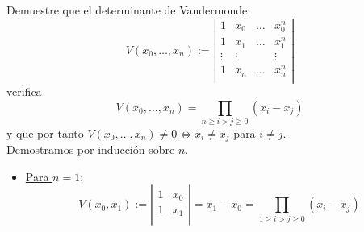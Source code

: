 \begin{ejercicio}
    Demuestre que el determinante de Vandermonde
    \begin{equation*}
        V(x_0, \dots, x_n):= \left|
        \begin{array}{cccc}
            1 & x_0 & \dots & x_0^n \\
            1 & x_1 & \dots & x_1^n \\
            \vdots & \vdots &  & \vdots \\
            1 & x_n & \dots & x_n^n \\
        \end{array}\right|
    \end{equation*}
    verifica
    \begin{equation*}
        V(x_0, \dots, x_n) = \prod_{n\geq i>j\geq 0}(x_i-x_j)
    \end{equation*}
    y que por tanto $V(x_0, \dots, x_n) \neq 0 \Longleftrightarrow x_i\neq x_j$ para $i\neq j$.\\

    Demostramos por inducción sobre $n$.
    \begin{itemize}
        \item \underline{Para $n=1$}:
        \begin{equation*}
            V(x_0, x_1):= \left|
            \begin{array}{cc}
                1 & x_0 \\
                1 & x_1\\
            \end{array}\right| = x_1 - x_0 = \prod_{1\geq i>j\geq 0}(x_i-x_j)
        \end{equation*}


\end{itemize}
\end{ejercicio}
